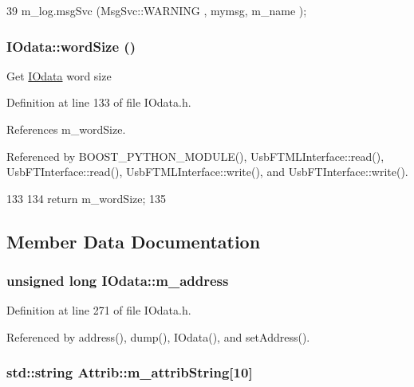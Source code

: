 \begin{DoxyCode}
39 { m_log.msgSvc (MsgSvc::WARNING , mymsg, m_name ); }
\end{DoxyCode}
\hypertarget{classIOdata_a91f9e8b4095ca8365a824e43be36b143}{
\subsubsection[{wordSize}]{ IOdata::wordSize ()}}
\label{classIOdata_a91f9e8b4095ca8365a824e43be36b143}
Get \hyperlink{classIOdata}{IOdata} word size 

Definition at line 133 of file IOdata.h.

References m\_\-wordSize.

Referenced by BOOST\_\-PYTHON\_\-MODULE(), UsbFTMLInterface::read(), UsbFTInterface::read(), UsbFTMLInterface::write(), and UsbFTInterface::write().


\begin{DoxyCode}
133                            {
134     return m_wordSize;
135   }
\end{DoxyCode}


\subsection{Member Data Documentation}
\hypertarget{classIOdata_a965810e1888b904c575277f50cea734a}{
\subsubsection[{m\_\-address}]{\setlength{\rightskip}{0pt plus 5cm}unsigned long {\bf IOdata::m\_\-address}}}
\label{classIOdata_a965810e1888b904c575277f50cea734a}


Definition at line 271 of file IOdata.h.

Referenced by address(), dump(), IOdata(), and setAddress().\hypertarget{classAttrib_a3414521d7a82476e874b25a5407b5e63}{
\subsubsection[{m\_\-attribString}]{\setlength{\rightskip}{0pt plus 5cm}std::string {\bf Attrib::m\_\-attribString}\mbox{[}10\mbox{]}}}
\label{classAttrib_a3414521d7a82476e874b25a5407b5e63}



